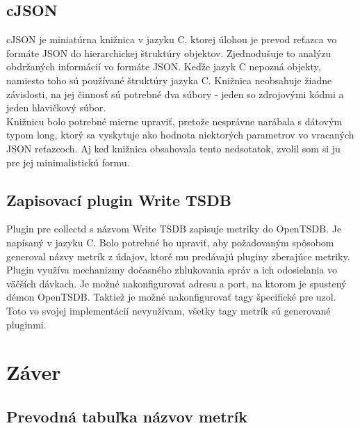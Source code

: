 \documentclass[12pt,twoside,color,cover,table]{fithesis3}
\begin{document}
\section{cJSON}
cJSON je miniatúrna knižnica v jazyku C, ktorej úlohou je prevod reťazca vo formáte JSON do hierarchickej štruktúry objektov. Zjednodušuje
to analýzu obdržaných informácií vo formáte JSON. Keďže jazyk C nepozná
objekty, namiesto toho sú používané štruktúry jazyka C. Knižnica neobsahuje žiadne závislosti, na jej činnosť sú potrebné dva súbory - 
jeden so zdrojovými kódmi a jeden hlavičkový súbor.
\\Knižnicu bolo potrebné mierne upraviť, pretože nesprávne narábala s dátovým typom long, ktorý sa vyskytuje ako hodnota niektorých parametrov
vo vracaných JSON reťazcoch. Aj keď knižnica obsahovala tento nedsotatok, zvolil som si ju pre jej minimalistickú formu.

\section{Zapisovací plugin Write TSDB}
Plugin pre collectd s názvom Write TSDB zapisuje metriky do OpenTSDB.%
Je napísaný v jazyku C. Bolo potrebné ho upraviť,
aby požadovaným spôsobom generoval názvy metrík z údajov, ktoré mu predávajú pluginy zberajúce metriky. Plugin využíva mechanizmy
dočasného zhlukovania správ a ich odosielania vo väčších dávkach. Je možné nakonfigurovať adresu a port, na ktorom je spustený
démon OpenTSDB. Taktiež je možné nakonfigurovať tagy špecifické pre uzol. Toto vo svojej implementácií nevyužívam,
všetky tagy metrík sú generované pluginmi.

\chapter{Záver}

\printbibliography[heading=bibintoc]

\begin{appendices}
\chapter{Prevodná tabuľka názvov metrík}
\end{appendices}
\end{document}
